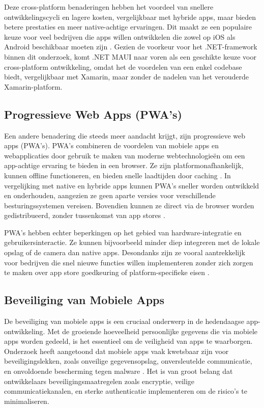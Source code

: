 Deze cross-platform benaderingen hebben het voordeel van snellere ontwikkelingscycli en lagere kosten, vergelijkbaar met hybride apps, maar bieden betere prestaties en meer native-achtige ervaringen. Dit maakt ze een populaire keuze voor veel bedrijven die apps willen ontwikkelen die zowel op iOS als Android beschikbaar moeten zijn \autocite{Amazon}. Gezien de voorkeur voor het .NET-framework binnen dit onderzoek, komt .NET MAUI naar voren als een geschikte keuze voor cross-platform ontwikkeling, omdat het de voordelen van een enkel codebase biedt, vergelijkbaar met Xamarin, maar zonder de nadelen van het verouderde Xamarin-platform.

\subsection{Progressieve Web Apps (PWA’s)} 
\noindent Een andere benadering die steeds meer aandacht krijgt, zijn progressieve web apps (PWA's). PWA's combineren de voordelen van mobiele apps en webapplicaties door gebruik te maken van moderne webtechnologieën om een app-achtige ervaring te bieden in een browser. Ze zijn platformonafhankelijk, kunnen offline functioneren, en bieden snelle laadtijden door caching \autocite{Fortunato2018}. In vergelijking met native en hybride apps kunnen PWA's sneller worden ontwikkeld en onderhouden, aangezien ze geen aparte versies voor verschillende besturingssystemen vereisen. Bovendien kunnen ze direct via de browser worden gedistribueerd, zonder tussenkomst van app stores \autocite{BioernHansen2018}.

PWA’s hebben echter beperkingen op het gebied van hardware-integratie en gebruikersinteractie. Ze kunnen bijvoorbeeld minder diep integreren met de lokale opslag of de camera dan native apps. Desondanks zijn ze vooral aantrekkelijk voor bedrijven die snel nieuwe functies willen implementeren zonder zich zorgen te maken over app store goedkeuring of platform-specifieke eisen \autocite{Mozilla}.

\subsection{Beveiliging van Mobiele Apps} 
\noindent De beveiliging van mobiele apps is een cruciaal onderwerp in de hedendaagse app-ontwikkeling. Met de groeiende hoeveelheid persoonlijke gegevens die via mobiele apps worden gedeeld, is het essentieel om de veiligheid van apps te waarborgen. Onderzoek heeft aangetoond dat mobiele apps vaak kwetsbaar zijn voor beveiligingslekken, zoals onveilige gegevensopslag, onversleutelde communicatie, en onvoldoende bescherming tegen malware \autocite{Zhu2014}. Het is van groot belang dat ontwikkelaars beveiligingsmaatregelen zoals encryptie, veilige communicatiekanalen, en sterke authenticatie implementeren om de risico’s te minimaliseren.

